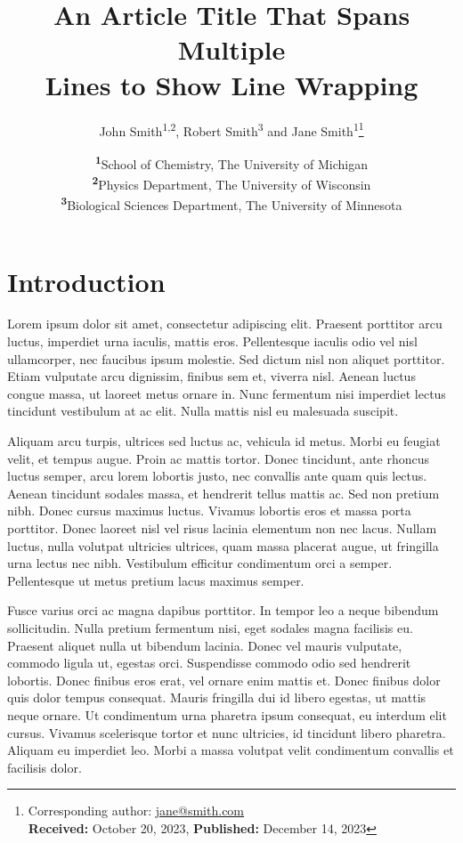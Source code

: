 \documentclass[
	a4paper, %
	10pt, %
	unnumberedsections, %
	twoside, %
]{documentclass}
\title{An Article Title That Spans Multiple\\ Lines to Show Line Wrapping} %
\author{%
	John Smith\textsuperscript{1,2}, Robert Smith\textsuperscript{3} and Jane Smith\textsuperscript{1}\thanks{Corresponding author: \href{mailto:jane@smith.com}{jane@smith.com}\\ \textbf{Received:} October 20, 2023, \textbf{Published:} December 14, 2023}
}
\date{\footnotesize\textsuperscript{\textbf{1}}School of Chemistry, The University of Michigan\\ \textsuperscript{\textbf{2}}Physics Department, The University of Wisconsin\\ \textsuperscript{\textbf{3}}Biological Sciences Department, The University of Minnesota}
\begin{document}
\maketitle %


\section{Introduction}

Lorem ipsum dolor sit amet, consectetur adipiscing elit. Praesent porttitor arcu luctus, imperdiet urna iaculis, mattis eros. Pellentesque iaculis odio vel nisl ullamcorper, nec faucibus ipsum molestie. Sed dictum nisl non aliquet porttitor. Etiam vulputate arcu dignissim, finibus sem et, viverra nisl. Aenean luctus congue massa, ut laoreet metus ornare in. Nunc fermentum nisi imperdiet lectus tincidunt vestibulum at ac elit. Nulla mattis nisl eu malesuada suscipit.

Aliquam arcu turpis, ultrices sed luctus ac, vehicula id metus. Morbi eu feugiat velit, et tempus augue. Proin ac mattis tortor. Donec tincidunt, ante rhoncus luctus semper, arcu lorem lobortis justo, nec convallis ante quam quis lectus. Aenean tincidunt sodales massa, et hendrerit tellus mattis ac. Sed non pretium nibh. Donec cursus maximus luctus. Vivamus lobortis eros et massa porta porttitor. Donec laoreet nisl vel risus lacinia elementum non nec lacus. Nullam luctus, nulla volutpat ultricies ultrices, quam massa placerat augue, ut fringilla urna lectus nec nibh. Vestibulum efficitur condimentum orci a semper. Pellentesque ut metus pretium lacus maximus semper.

Fusce varius orci ac magna dapibus porttitor. In tempor leo a neque bibendum sollicitudin. Nulla pretium fermentum nisi, eget sodales magna facilisis eu. Praesent aliquet nulla ut bibendum lacinia. Donec vel mauris vulputate, commodo ligula ut, egestas orci. Suspendisse commodo odio sed hendrerit lobortis. Donec finibus eros erat, vel ornare enim mattis et. Donec finibus dolor quis dolor tempus consequat. Mauris fringilla dui id libero egestas, ut mattis neque ornare. Ut condimentum urna pharetra ipsum consequat, eu interdum elit cursus. Vivamus scelerisque tortor et nunc ultricies, id tincidunt libero pharetra. Aliquam eu imperdiet leo. Morbi a massa volutpat velit condimentum convallis et facilisis dolor.
\end{document}
